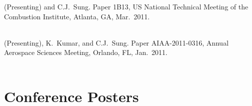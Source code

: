 \begin{bibmune}
\item {} (Presenting) and C.J.\ Sung.
         Paper 1B13,   US National Technical
        Meeting of the Combustion Institute, Atlanta, GA, Mar.\ 2011.\\
        \\

\item {} (Presenting), K.\ Kumar, and C.J.\ Sung.
         Paper AIAA-2011-0316,
         Annual Aerospace Sciences Meeting,
        Orlando, FL, Jan.\ 2011.\\
        \\
\end{bibmune}

\section{{\sectionfont Conference Posters}}

